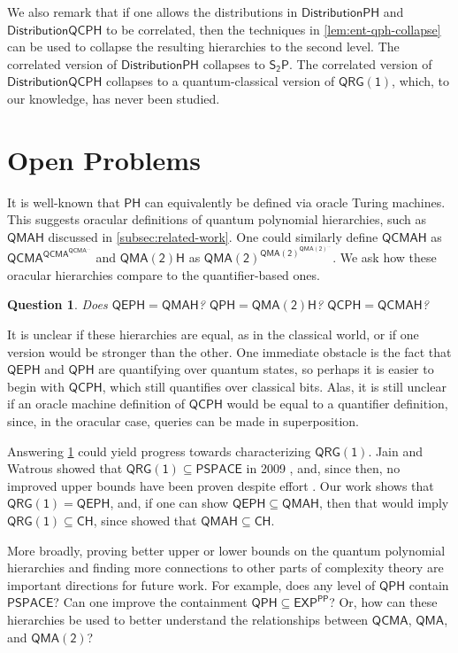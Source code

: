 \documentclass[10pt,a4paper]{article}
\newtheorem{question}[theorem]{Question}
\theoremstyle{definition}
\newcommand{\class}[1]{\ensuremath{\mathsf{#1}}\xspace}
\newcommand{\EXP}{\class{EXP}}
\newcommand{\PSPACE}{\class{PSPACE}}
\newcommand{\QCMA}{\class{QCMA}}
\newcommand{\QMA}{\class{QMA}}
\newcommand{\QMAk}[1][k]{\class{QMA(#1)}}
\newcommand{\QMAtwo}{\QMAk[2]}
\newcommand{\QRGk}[1][k]{\class{QRG(#1)}}
\newcommand{\QRGone}{\QRGk[1]}
\newcommand{\CH}{\class{CH}}
\newcommand{\PP}{\class{PP}}
\newcommand{\PH}{\class{PH}}
\newcommand{\QCPH}{\class{QCPH}}
\newcommand{\QPH}{\class{QPH}}
\newcommand{\QEPH}{\class{QEPH}}
\newcommand{\QMAH}{\class{QMAH}}
\newcommand{\QCMAH}{\class{QCMAH}}
\newcommand{\StwoP}{\class{S_{2}P}}
\newcommand{\distributionPH}{\mixedPH}
\newcommand{\distributionQCPH}{\mathsf{DistributionQCPH}}
\newcommand{\mixedPH}{\class{DistributionPH}}
\begin{document}
We also remark that if one allows the distributions in $\distributionPH$ and $\distributionQCPH$ to be correlated, then the techniques in \cref{lem:ent-qph-collapse} can be used to collapse the resulting hierarchies to the second level. The correlated version of $\distributionPH$ collapses to $\StwoP$. 
The correlated version of $\distributionQCPH$ collapses to a quantum-classical version of $\QRGone$, which, to our knowledge, has never been studied. 



\section{Open Problems}\label{sec:openproblems}

It is well-known that $\PH$ can equivalently be defined via oracle Turing machines. 
This suggests oracular definitions of quantum polynomial hierarchies, such as $\QMAH$ discussed in \cref{subsec:related-work}. 
One could similarly define $\mathsf{\QCMAH}$ as $\QCMA^{\QCMA^{\QCMA^{\ldots}}}$ and $\mathsf{QMA(2)H}$ as $\QMAtwo^{\QMAtwo^{\QMAtwo^{\ldots}}}$.
We ask how these oracular hierarchies compare to the quantifier-based ones.

\begin{question}\label{question:oracle-vs-quantifier}
    Does $\QEPH = \QMAH$? $\QPH = \mathsf{QMA(2)H}$? $\QCPH = \mathsf{QCMAH}$?
\end{question}

It is unclear if these hierarchies are equal, as in the classical world, or if one version would be stronger than the other.
One immediate obstacle is the fact that $\QEPH$ and $\QPH$ are quantifying over quantum states, so perhaps it is easier to begin with $\QCPH$, which still quantifies over classical bits. 
Alas, it is still unclear if an oracle machine definition of $\QCPH$ would be equal to a quantifier definition, since, in the oracular case, queries can be made in superposition.


Answering \cref{question:oracle-vs-quantifier} could yield progress towards characterizing $\QRGone$.
Jain and Watrous showed that $\QRGone \subseteq \PSPACE$ in 2009 \cite{jain2009parallel}, and, since then, no improved upper bounds have been proven despite effort \cite{ghosh2023complexity}. 
Our work shows that $\QRGone = \QEPH$, and, if one can show $\QEPH \subseteq \QMAH$, then that would imply $\QRGone \subseteq \CH$, since \cite{V18_BQPHthesis} showed that $\QMAH \subseteq \CH$.

More broadly, proving better upper or lower bounds on the quantum polynomial hierarchies and finding more connections to other parts of complexity theory are important directions for future work. 
For example, does any level of $\QPH$ contain $\PSPACE$? 
Can one improve the containment $\QPH \subseteq \EXP^\PP$?
Or, how can these hierarchies be used to better understand the relationships between $\QCMA$, $\QMA$, and $\QMAtwo$?
\end{document}
